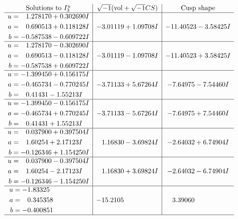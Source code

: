 \documentclass[1p]{elsarticle_modified}
\theoremstyle{definition}
\newcommand{\I}{\sqrt{-1}}
\begin{document}
$$\begin{array}{c|c|c}  
\text{Solutions to }I^u_{3}& \I (\text{vol} + \sqrt{-1}CS) & \text{Cusp shape}\\
 \hline 
\begin{aligned}
u &= \phantom{-}1.278170 + 0.302690 I \\
a &= \phantom{-}0.690513 + 0.118128 I \\
b &= -0.587538 - 0.609722 I\end{aligned}
 & -3.01119 + 1.09708 I & -11.40523 - 3.58425 I \\ \hline\begin{aligned}
u &= \phantom{-}1.278170 - 0.302690 I \\
a &= \phantom{-}0.690513 - 0.118128 I \\
b &= -0.587538 + 0.609722 I\end{aligned}
 & -3.01119 - 1.09708 I & -11.40523 + 3.58425 I \\ \hline\begin{aligned}
u &= -1.399450 + 0.156175 I \\
a &= -0.465734 - 0.770245 I \\
b &= \phantom{-}0.41431 - 1.55213 I\end{aligned}
 & -3.71133 + 5.67264 I & -7.64975 - 7.54460 I \\ \hline\begin{aligned}
u &= -1.399450 - 0.156175 I \\
a &= -0.465734 + 0.770245 I \\
b &= \phantom{-}0.41431 + 1.55213 I\end{aligned}
 & -3.71133 - 5.67264 I & -7.64975 + 7.54460 I \\ \hline\begin{aligned}
u &= \phantom{-}0.037900 + 0.397504 I \\
a &= \phantom{-}1.60254 + 2.17123 I \\
b &= -0.126346 + 1.154250 I\end{aligned}
 & \phantom{-}1.16830 - 3.69824 I & -2.64032 + 6.74904 I \\ \hline\begin{aligned}
u &= \phantom{-}0.037900 - 0.397504 I \\
a &= \phantom{-}1.60254 - 2.17123 I \\
b &= -0.126346 - 1.154250 I\end{aligned}
 & \phantom{-}1.16830 + 3.69824 I & -2.64032 - 6.74904 I \\ \hline\begin{aligned}
u &= -1.83325\phantom{ +0.000000I} \\
a &= \phantom{-}0.345358\phantom{ +0.000000I} \\
b &= -0.400851\phantom{ +0.000000I}\end{aligned}
 & -15.2105\phantom{ +0.000000I} & \phantom{-}3.39060\phantom{ +0.000000I}\\
 \hline 
 \end{array}$$\newpage\newpage\renewcommand{\arraystretch}{1}
\end{document}
